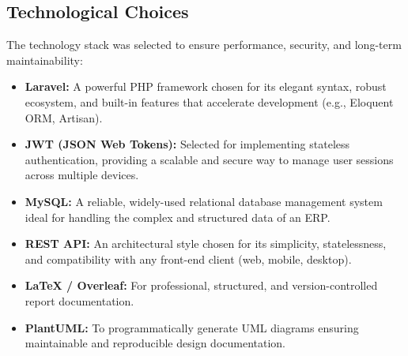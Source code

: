 \subsection{Technological Choices}
The technology stack was selected to ensure performance, security, and long-term maintainability:
\begin{itemize}
    \item \textbf{Laravel:} A powerful PHP framework chosen for its elegant syntax, robust ecosystem, and built-in features that accelerate development (e.g., Eloquent ORM, Artisan).
    \item \textbf{JWT (JSON Web Tokens):} Selected for implementing stateless authentication, providing a scalable and secure way to manage user sessions across multiple devices.
    \item \textbf{MySQL:} A reliable, widely-used relational database management system ideal for handling the complex and structured data of an ERP.
    \item \textbf{REST API:} An architectural style chosen for its simplicity, statelessness, and compatibility with any front-end client (web, mobile, desktop).
    \item \textbf{LaTeX / Overleaf:} For professional, structured, and version-controlled report documentation.
    \item \textbf{PlantUML:} To programmatically generate UML diagrams ensuring maintainable and reproducible design documentation.
\end{itemize}

